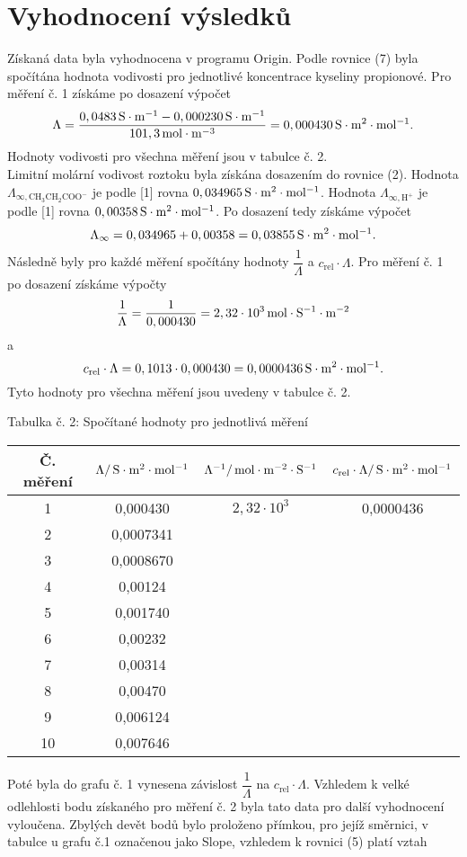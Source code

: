 \documentclass[12pt,a4paper]{article}
\def\ri#1{\mathrm{#1}}
\def\jd#1{\ifmmode\,\mathrm{#1}\else\,\textrm{#1}\fi}
\begin{document}
\section*{Vyhodnocení výsledků}
Získaná data byla vyhodnocena v programu Origin. Podle rovnice (7) byla spočítána hodnota vodivosti pro jednotlivé koncentrace kyseliny propionové. Pro měření č. 1 získáme po dosazení výpočet
$$\Lambda = \dfrac{0,0483\jd{S\cdot m^{-1}}-0,000230\jd{S\cdot m^{-1}}}{101,3\jd{mol\cdot m^{-3}}} = 0,000430\jd{S\cdot m^2\cdot mol^{-1}}.$$
Hodnoty vodivosti pro všechna měření jsou v tabulce č. 2.\\
Limitní molární vodivost roztoku byla získána dosazením do rovnice (2). Hodnota $\Lambda_\ri{\infty, CH_3CH_2COO^-}$ je podle [1] rovna $0,034965\jd{S\cdot m^2\cdot mol^{-1}}$. Hodnota $\Lambda_\ri{\infty, H^+}$ je podle [1] rovna $0,00358\jd{S\cdot m^2\cdot mol^{-1}}$. Po dosazení tedy získáme výpočet
$$\Lambda_\infty = 0,034965 + 0,00358 = 0,03855\jd{S\cdot m^2\cdot mol^{-1}}.$$
Následně byly pro každé měření spočítány hodnoty $\dfrac{1}{\Lambda}$ a $c_\ri{rel}\cdot \Lambda$. Pro měření č. 1 po dosazení získáme výpočty
$$\dfrac{1}{\Lambda} = \dfrac{1}{0,000430} = 2,32\cdot 10^3\jd{mol\cdot S^{-1}\cdot m^{-2}}$$
a $$c_\ri{rel}\cdot \Lambda = 0,1013\cdot 0,000430 = 0,0000436\jd{S\cdot m^2\cdot mol^{-1}}.$$
Tyto hodnoty pro všechna měření jsou uvedeny v tabulce č. 2.\\
\begin{center}
	\noindent Tabulka č. 2: Spočítané hodnoty pro jednotlivá měření
	\begin{tabular}{c|c|c|c}
		Č. měření & $\Lambda/\jd{S\cdot m^2 \cdot mol^{-1}}$ & $\Lambda^{-1}/\jd{mol\cdot m^{-2} \cdot S^{-1}}$ & $c_\ri{rel}\cdot \Lambda/\jd{S\cdot m^2 \cdot mol^{-1}}$\\
		\hline
		1 & 0,000430 & $2,32\cdot 10^3$ & 0,0000436\\
		2 & 0,0007341 & &\\
		3 & 0,0008670 & &\\
		4 & 0,00124 & &\\
		5 & 0,001740 & &\\
		6 & 0,00232 & &\\
		7 & 0,00314 & &\\
		8 & 0,00470 & &\\
		9 & 0,006124 & &\\
		10 & 0,007646 & &\\
	\end{tabular}
\end{center}
Poté byla do grafu č. 1 vynesena závislost $\dfrac{1}{\Lambda}$ na $c_\ri{rel}\cdot \Lambda$. Vzhledem k velké odlehlosti bodu získaného pro měření č. 2 byla tato data pro další vyhodnocení vyloučena. Zbylých devět bodů bylo proloženo přímkou, pro jejíž směrnici, v tabulce u grafu č.1  označenou jako Slope, vzhledem k rovnici (5) platí vztah 
\end{document}
